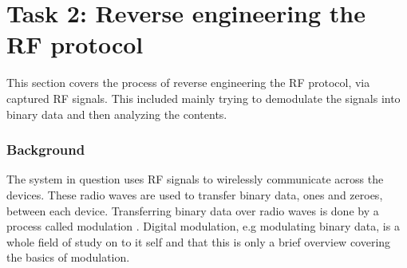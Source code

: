\section{Task 2: Reverse engineering the RF protocol} \label{ch:pentesting:rf-reverse-engineering}
This section covers the process of reverse engineering the RF protocol, via captured RF signals. This included mainly trying to demodulate the signals into binary data and then analyzing the contents.

\subsubsection{Background}
The system in question uses RF signals to wirelessly communicate across the devices. These radio waves are used to transfer binary data, ones and zeroes, between each device. Transferring binary data over radio waves is done by a process called modulation \cite{rf-modulation}. Digital modulation, e.g modulating binary data, is a whole field of study on to it self and that this is only a brief overview covering the basics of modulation.

